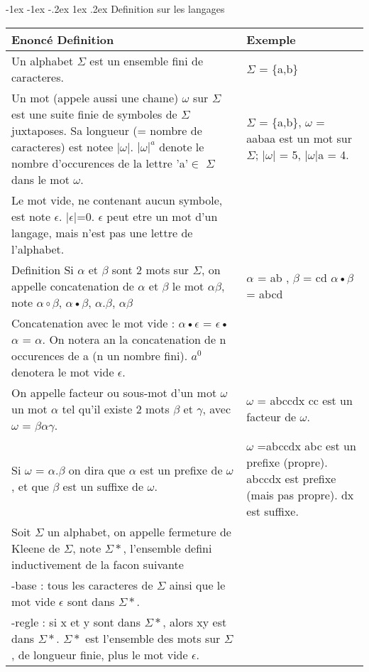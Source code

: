 \documentclass[5pt]{article}
\makeatletter
\renewcommand{\subsubsection}{\@startsection {section}{1}{\z@}%
             {-1ex \@plus -1ex \@minus -.2ex}%
             {1ex \@plus.2ex}%
             {\normalfont\scriptsize\sffamily\bfseries}}
\makeatother
\begin{document}
\begin{scriptsize}
\subsubsection{Definition sur les langages}
\begin{tabularx}{\linewidth}{|Y|Y|}
\hline
Enoncé Definition & Exemple \\ \hline
Un alphabet $\Sigma$ est un ensemble fini de caracteres.&
$\Sigma$ = \{a,b\}\\\hline
Un mot (appele aussi une chaıne) $\omega$ sur $\Sigma$ est une suite finie de symboles de $\Sigma$ juxtaposes.
Sa longueur (= nombre de caracteres) est notee |$\omega$|.
$|\omega|^{a}$ denote le nombre d'occurences de la lettre 'a'$\in$ $\Sigma$ dans le mot $\omega$.&
$\Sigma$ = \{a,b\}, $\omega$ = aabaa est un mot sur $\Sigma$; |$\omega$| = 5, |$\omega$|a = 4.\\\hline
Le mot vide, ne contenant aucun symbole, est note $\epsilon$.
|$\epsilon$|=0.
$\epsilon$ peut etre un mot d'un langage, mais n'est pas une lettre de l'alphabet.&\\\hline
Definition Si $\alpha$ et $\beta$ sont 2 mots sur $\Sigma$, on appelle concatenation de $\alpha$ et $\beta$ le mot $\alpha\beta$,
note $\alpha\circ\beta$, $\alpha$•$\beta$, $\alpha$.$\beta$, $\alpha\beta$&
$\alpha$ = ab , $\beta$ = cd $\alpha$•$\beta$ = abcd\\\hline
Concatenation avec le mot vide : $\alpha$•$\epsilon$ = $\epsilon$•$\alpha$ = $\alpha$.
On notera an la concatenation de n occurences de a (n un nombre fini).
$a^{0}$ denotera le mot vide $\epsilon$.&
\\\hline
On appelle facteur ou sous-mot d’un mot $\omega$
un mot $\alpha$ tel qu’il existe 2 mots $\beta$ et $\gamma$, avec $\omega$ = $\beta\alpha\gamma$.&
$\omega$ = abccdx cc est un facteur de $\omega$.\\\hline
Si $\omega$ = $\alpha$.$\beta$ on dira que $\alpha$ est un prefixe de $\omega$, et que $\beta$ est un suffixe de $\omega$.&
$\omega$ =abccdx abc est un prefixe (propre). abccdx est prefixe (mais pas propre). dx est suffixe.\\\hline
Soit $\Sigma$ un alphabet, on appelle fermeture de Kleene de $\Sigma$, note $\Sigma*$, l’ensemble defini inductivement de la facon suivante\\
-base : tous les caracteres de $\Sigma$ ainsi que le mot vide $\epsilon$ sont dans $\Sigma*$.\\
-regle : si x et y sont dans $\Sigma*$, alors xy est dans $\Sigma*$. $\Sigma*$ est l’ensemble des mots sur $\Sigma$, de longueur finie, plus le mot vide $\epsilon$. &\\\hline

\end{tabularx}
\end{scriptsize}
\end{document}
